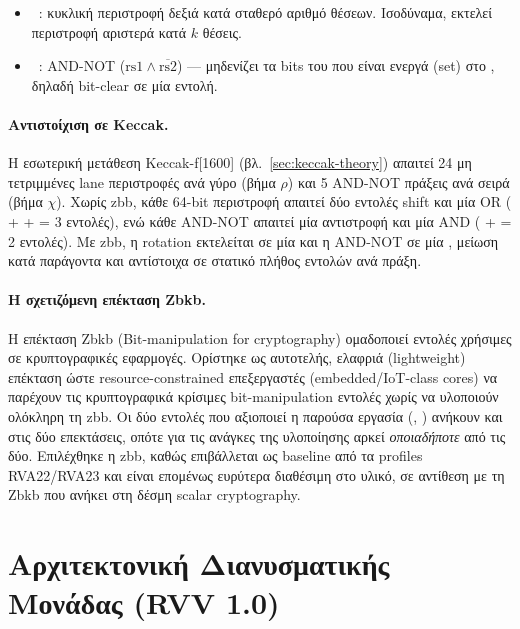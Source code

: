\begin{itemize}
  \item \rori~: κυκλική περιστροφή δεξιά κατά
    σταθερό αριθμό θέσεων. Ισοδύναμα,  εκτελεί περιστροφή
    αριστερά κατά $k$ θέσεις.
  \item {}~: AND-NOT ($\text{rs1} \wedge
    \overline{\text{rs2}}$) — μηδενίζει τα bits του  που είναι
    ενεργά (set) στο , δηλαδή bit-clear σε μία εντολή.
\end{itemize}

\paragraph{Αντιστοίχιση σε Keccak.}
Η εσωτερική μετάθεση Keccak-f[1600] (βλ.~\cref{sec:keccak-theory}) απαιτεί
\num{24} μη τετριμμένες lane περιστροφές ανά γύρο (βήμα $\rho$) και \num{5} AND-NOT πράξεις
ανά σειρά (βήμα $\chi$). Χωρίς \gls{zbb}, κάθε 64-bit περιστροφή απαιτεί δύο
εντολές shift και μία OR ( +  +  = 3 εντολές),
ενώ κάθε AND-NOT απαιτεί μία αντιστροφή και μία AND ( + 
= 2 εντολές). Με \gls{zbb}, η rotation εκτελείται σε μία \rori και η AND-NOT σε
μία , μείωση κατά παράγοντα  και  αντίστοιχα σε
στατικό πλήθος εντολών ανά πράξη.

\paragraph{Η σχετιζόμενη επέκταση Zbkb.}

Η επέκταση Zbkb (Bit-manipulation for cryptography) ομαδοποιεί εντολές
χρήσιμες σε κρυπτογραφικές εφαρμογές. Ορίστηκε ως αυτοτελής, ελαφριά
(lightweight) επέκταση ώστε resource-constrained επεξεργαστές (embedded/IoT-class
cores) να παρέχουν τις κρυπτογραφικά κρίσιμες bit-manipulation εντολές χωρίς να
υλοποιούν ολόκληρη τη \gls{zbb}. Οι δύο εντολές που αξιοποιεί η παρούσα εργασία
(, ) ανήκουν και στις δύο επεκτάσεις, οπότε για τις ανάγκες
της υλοποίησης αρκεί \emph{οποιαδήποτε} από τις δύο. 
Επιλέχθηκε η \gls{zbb}, καθώς επιβάλλεται ως baseline από τα
profiles RVA22/RVA23 και είναι επομένως ευρύτερα διαθέσιμη στο υλικό, σε αντίθεση
με τη Zbkb που ανήκει στη δέσμη scalar cryptography.

\section{Αρχιτεκτονική Διανυσματικής Μονάδας (RVV 1.0)}
\label{sec:rvv-architecture}

